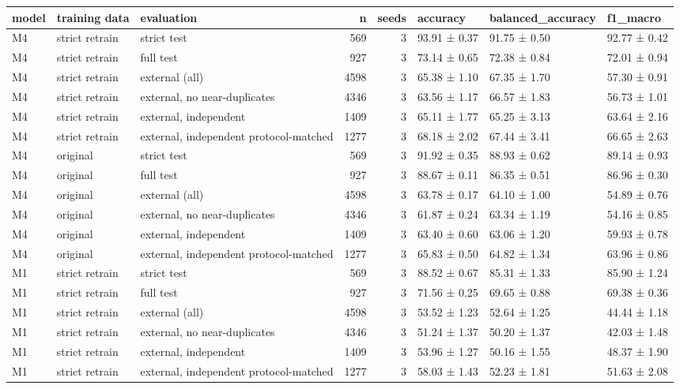 \begin{tabular}{lllrrlll}
\toprule
model & training data & evaluation & n & seeds & accuracy & balanced\_accuracy & f1\_macro \\
\midrule
M4 & strict retrain & strict test & 569 & 3 & 93.91 ± 0.37 & 91.75 ± 0.50 & 92.77 ± 0.42 \\
M4 & strict retrain & full test & 927 & 3 & 73.14 ± 0.65 & 72.38 ± 0.84 & 72.01 ± 0.94 \\
M4 & strict retrain & external (all) & 4598 & 3 & 65.38 ± 1.10 & 67.35 ± 1.70 & 57.30 ± 0.91 \\
M4 & strict retrain & external, no near-duplicates & 4346 & 3 & 63.56 ± 1.17 & 66.57 ± 1.83 & 56.73 ± 1.01 \\
M4 & strict retrain & external, independent & 1409 & 3 & 65.11 ± 1.77 & 65.25 ± 3.13 & 63.64 ± 2.16 \\
M4 & strict retrain & external, independent protocol-matched & 1277 & 3 & 68.18 ± 2.02 & 67.44 ± 3.41 & 66.65 ± 2.63 \\
M4 & original & strict test & 569 & 3 & 91.92 ± 0.35 & 88.93 ± 0.62 & 89.14 ± 0.93 \\
M4 & original & full test & 927 & 3 & 88.67 ± 0.11 & 86.35 ± 0.51 & 86.96 ± 0.30 \\
M4 & original & external (all) & 4598 & 3 & 63.78 ± 0.17 & 64.10 ± 1.00 & 54.89 ± 0.76 \\
M4 & original & external, no near-duplicates & 4346 & 3 & 61.87 ± 0.24 & 63.34 ± 1.19 & 54.16 ± 0.85 \\
M4 & original & external, independent & 1409 & 3 & 63.40 ± 0.60 & 63.06 ± 1.20 & 59.93 ± 0.78 \\
M4 & original & external, independent protocol-matched & 1277 & 3 & 65.83 ± 0.50 & 64.82 ± 1.34 & 63.96 ± 0.86 \\
M1 & strict retrain & strict test & 569 & 3 & 88.52 ± 0.67 & 85.31 ± 1.33 & 85.90 ± 1.24 \\
M1 & strict retrain & full test & 927 & 3 & 71.56 ± 0.25 & 69.65 ± 0.88 & 69.38 ± 0.36 \\
M1 & strict retrain & external (all) & 4598 & 3 & 53.52 ± 1.23 & 52.64 ± 1.25 & 44.44 ± 1.18 \\
M1 & strict retrain & external, no near-duplicates & 4346 & 3 & 51.24 ± 1.37 & 50.20 ± 1.37 & 42.03 ± 1.48 \\
M1 & strict retrain & external, independent & 1409 & 3 & 53.96 ± 1.27 & 50.16 ± 1.55 & 48.37 ± 1.90 \\
M1 & strict retrain & external, independent protocol-matched & 1277 & 3 & 58.03 ± 1.43 & 52.23 ± 1.81 & 51.63 ± 2.08 \\

\end{tabular}
